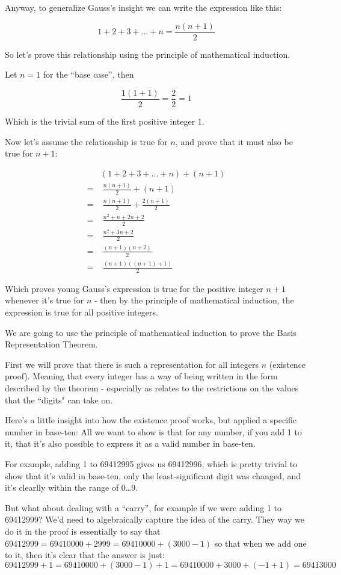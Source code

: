 \documentclass{article}
\begin{document}
Anyway,
to generalize Gauss's insight we can write the expression like this:

\[1+2+3+\ldots+n=\frac{n(n+1)}{2}\]

So let's prove this relationship using the principle of mathematical induction.
\bigskip

Let $n=1$ for the ``base case'',
then

\[\frac{1(1+1)}{2}=\frac{2}{2}=1\]

Which is the trivial sum of the first positive integer 1.
\bigskip

Now let's assume the relationship is true for $n$,
and prove that it must also be true for $n+1$:

\begin{align*}
&(1+2+3+\ldots+n) + (n+1)\\
= & \; \frac{n(n+1)}{2} + (n+1)\\
= & \; \frac{n(n+1)}{2} + \frac{2(n+1)}{2}\\
= & \; \frac{n^2+n+2n+2}{2}\\
= & \; \frac{n^2+3n+2}{2}\\
= & \; \frac{(n+1)(n+2)}{2}\\
= & \; \frac{(n+1)((n+1)+1)}{2}
\end{align*}

Which proves young Gauss's expression is true for
the positive integer $n+1$ whenever it's true for $n$ - then
by the principle of mathematical induction,
the expression is true for all positive integers.
\bigskip

We are going to use the principle of mathematical induction to prove the Basis Representation Theorem.

First we will prove that there is such a representation for all
integers $n$ (existence proof).
Meaning that every integer has a way of being written
in the form described by the theorem - especially as
relates to the restrictions on the values that the ``digits" can take on.

Here's a little insight into how the existence proof works, but applied a specific number in base-ten:
All we want to show is that for any number, if you add 1 to it, that it's also possible to express it as a valid number in base-ten.

For example, adding 1 to 69412995 gives us 69412996, which is pretty trivial to show that it's valid in base-ten, only the least-significant digit was
changed, and it's clearlly within the range of 0\dots{}9.

But what about dealing with a ``carry'', for example 
if we were adding 1 to 69412999? We'd need to algebraically capture the idea of the carry.  They way
we do it in the proof is essentially to say that $69412999 = 69410000 + 2999 = 69410000 + (3000-1)$ so that when we add one to it, then
it's clear that the answer is just:
\[69412999 + 1 = 69410000 + (3000-1) + 1 = 69410000 + 3000 + (-1 + 1) = 69413000\]
\end{document}
